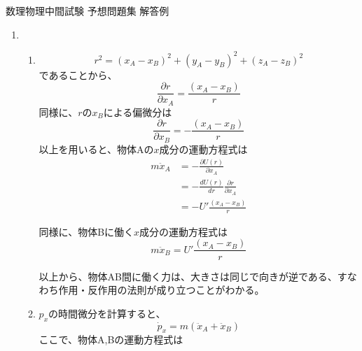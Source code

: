 \documentclass{jsarticle}
\begin{document}
\begin{center}
  {\huge 数理物理中間試験 予想問題集 解答例}\\
\end{center}

\begin{enumerate}
  \item
        \begin{enumerate}
          \item $$
                  r^2 = (x_A-x_B)^2+(y_A-y_B)^2+(z_A-z_B)^2
                $$
                であることから、
                $$
                  \frac{\partial r}{\partial x_A} = \frac{(x_A-x_B)}{r}
                $$
                同様に、$r$の$x_B$による偏微分は
                $$
                  \frac{\partial r}{\partial x_B} = -\frac{(x_A-x_B)}{r}
                $$
                以上を用いると、物体Aの$x$成分の運動方程式は
                $$
                  \begin{aligned}
                    m \ddot{x}_A & = - \frac{\partial U(r)}{\partial x_A}                \\
                                 & =- \frac{d U(r)}{d r} \frac{\partial r}{\partial x_A} \\
                                 & = -U' \frac{(x_A-x_B)}{r}
                  \end{aligned}
                $$

                同様に、物体Bに働く$x$成分の運動方程式は
                $$
                  m \ddot{x}_B = U'\frac{(x_A-x_B)}{r}
                $$

                以上から、物体AB間に働く力は、大きさは同じで向きが逆である、すなわち作用・反作用の法則が成り立つことがわかる。
          \item $p_x$の時間微分を計算すると、
                $$
                  \dot{p}_x = m(\ddot{x}_A + \ddot{x}_B)
                $$
                ここで、物体A,Bの運動方程式は


\end{enumerate}
\end{enumerate}
\end{document}
